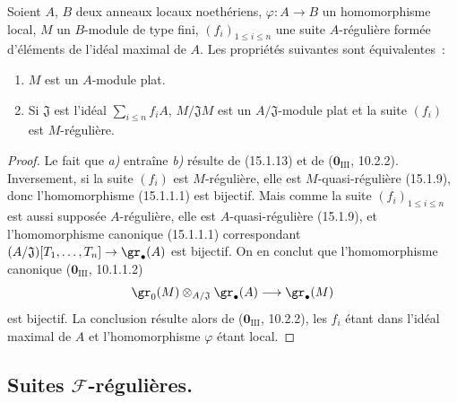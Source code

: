 \begin{proposition}[15.1.21]
\label{0.15.1.21-fr}
Soient $A$, $B$ deux anneaux locaux noethériens, $\varphi:A\to B$ un
homomorphisme local, $M$ un $B$-module de type fini, $(f_i)_{1\leq i\leq n}$
une suite $A$-régulière formée d'éléments de l'idéal maximal de $A$. Les
propriétés suivantes sont équivalentes~:
\begin{enumerate}
  \item[\textup{a)}] $M$ est un $A$-module plat.
  \item[\textup{b)}] Si $\mathfrak{J}$ est l'idéal $\sum_{i\leq n}f_iA$,
  $M/\mathfrak{J}M$ est un $A/\mathfrak{J}$-module plat et la suite $(f_i)$
  est $M$-régulière.
\end{enumerate}
\end{proposition}

\begin{proof}
Le fait que \emph{a)} entraîne \emph{b)} résulte de (15.1.13) et de
($\mathbf{0}_{\mathrm{III}}$, 10.2.2). Inversement, si la suite $(f_i)$ est
$M$-régulière, elle est $M$-quasi-régulière (15.1.9), donc l'homomorphisme
(15.1.1.1) est bijectif. Mais comme la suite $(f_i)_{1\leq i\leq n}$ est aussi
supposée $A$-régulière, elle est $A$-quasi-régulière (15.1.9), et
l'homomorphisme canonique (15.1.1.1) correspondant
$(A/\mathfrak{J})[T_1,\ldots,T_n]\to\gr_\bullet(A)$ est bijectif. On en
conclut que l'homomorphisme canonique ($\mathbf{0}_{\mathrm{III}}$, 10.1.1.2)
\[
  \gr_0(M)\otimes_{A/\mathfrak{J}}\gr_\bullet(A)
  \longrightarrow\gr_\bullet(M)
\]
est bijectif. La conclusion résulte alors de ($\mathbf{0}_{\mathrm{III}}$, 10.2.2),
les $f_i$ étant dans l'idéal maximal de $A$ et l'homomorphisme $\varphi$ étant
local.
\end{proof}

\subsection{Suites \texorpdfstring{$\mathscr{F}$}{F}-régulières.}
\label{subsection:0.15.2-fr}

